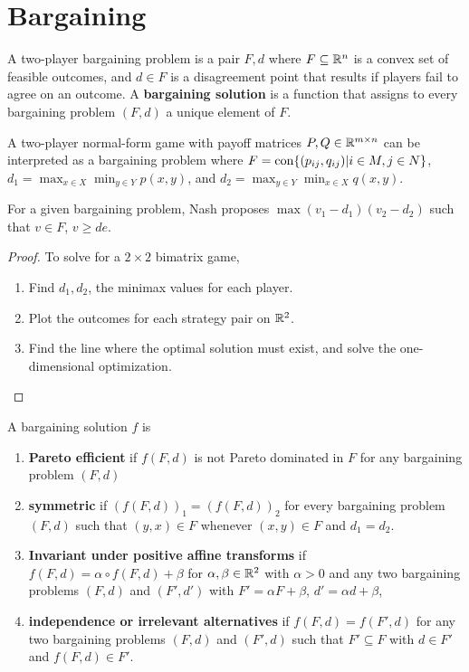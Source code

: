 \section{Bargaining}
\label{sec:bargaining}

\begin{defn}
  \label{sec:bargaining-1}
  A two-player bargaining problem is a pair $F, d$ where $F \subseteq
  \mathbb{R}^{n}$ is a convex set of feasible outcomes, and $d \in F$ is a
  disagreement point that results if players fail to agree on an
  outcome.  A \textbf{bargaining solution} is a function that assigns
  to every bargaining problem $(F, d)$ a unique element of $F$.

  A two-player normal-form game with payoff matrices $P, Q \in \mathbb{R}^{m
    \times n}$ can be interpreted as a bargaining problem where $F =
  \operatorname*{con} \{ (p_{ij}, q_{ij}) | i \in M, j \in N \} $, $d_{1} = \max_{x
    \in X} \min_{y \in Y} p(x, y)$, and $d_{2} = \max_{y \in Y}
  \min_{x \in X} q(x, y)$.
\end{defn}

\begin{thm}
  \label{sec:bargaining-2}
  For a given bargaining problem, Nash proposes $\max (v_{1} -
  d_{1})(v_{2} - d_{2})$ such that $v \in F$, $v \geq de$.
\end{thm}

\begin{proof}
  To solve for a $2 \times 2$ bimatrix game,
  \begin{enumerate}
  \item Find $d_{1}, d_{2}$, the minimax values for each player.
  \item Plot the outcomes for each strategy pair on $\mathbb{R}^{2}$.
  \item Find the line where the optimal solution must exist, and solve
    the one-dimensional optimization.
  \end{enumerate}
\end{proof}

\begin{defn}
  \label{sec:bargaining-3}
  A bargaining solution $f$ is
  \begin{enumerate}
  \item \textbf{Pareto efficient} if $f(F, d)$ is not Pareto dominated
    in $F$ for any bargaining problem $(F, d)$
  \item \textbf{symmetric} if $(f(F, d))_{1} = (f(F, d))_{2}$ for
    every bargaining problem $(F, d)$ such that $(y, x) \in F$
    whenever $(x, y) \in F$ and $d_{1} = d_{2}$.
  \item \textbf{Invariant under positive affine transforms} if $f(F, d) =
    \alpha \circ f(F, d) + \beta$ for $\alpha, \beta \in \mathbb{R}^{2}$ with
    $\alpha > 0$ and any two bargaining problems $(F, d)$ and $(F',
    d')$ with $F' = \alpha F + \beta$, $d' = \alpha d + \beta$,
  \item \textbf{independence or irrelevant alternatives} if $f(F, d) =
    f(F', d)$ for any two bargaining problems $(F, d)$ and $(F', d)$
    such that $F' \subseteq F$ with $d \in F'$ and $f(F, d) \in F'$.
  \end{enumerate}
\end{defn}

